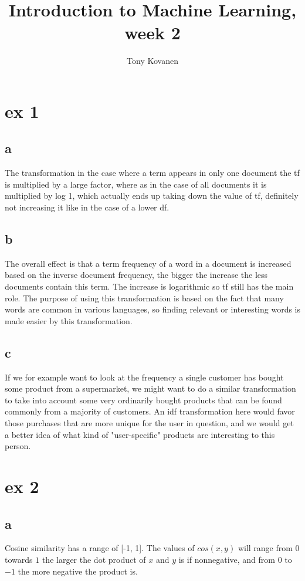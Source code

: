 \documentclass{article}
\title{Introduction to Machine Learning, week 2}
\author{Tony Kovanen}
\begin{document}
\section{ex 1}
\subsection{a}
The transformation in the case where a term appears in only one document the tf is multiplied by a large factor, where as in the case of all documents it is multiplied by log 1, which actually ends up taking down the value of tf, definitely not increasing it like in the case of a lower df.

\subsection{b}
The overall effect is that a term frequency of a word in a document is increased based on the inverse document frequency, the bigger the increase the less documents contain this term. The increase is logarithmic so tf still has the main role. The purpose of using this transformation is based on the fact that many words are common in various languages, so finding relevant or interesting words is made easier by this transformation. 

\subsection{c}
If we for example want to look at the frequency a single customer has bought some product from a supermarket, we might want to do a similar transformation to take into account some very ordinarily bought products that can be found commonly from a majority of customers. An idf transformation here would favor those purchases that are more unique for the user in question, and we would get a better idea of what kind of "user-specific" products are interesting to this person.

\section{ex 2}
\subsection{a}
Cosine similarity has a range of [-1, 1]. The values of $cos(x, y)$ will range from $0$ towards $1$ the larger the dot product of $x$ and $y$ is if nonnegative, and from $0$ to $-1$ the more negative the product is.
\end{document}
